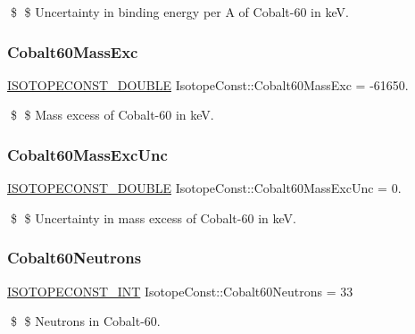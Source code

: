 \$ \$ Uncertainty in binding energy per A of Cobalt-\/60 in keV. \mbox{\label{group___isotope_const-_cobalt-_co60_ga7a0da0914106ad30627df699b24654e4}} 
\subsubsection{\texorpdfstring{Cobalt60\+Mass\+Exc}{Cobalt60MassExc}}
{\footnotesize\ttfamily \mbox{\hyperlink{group___isotope_const-_macros_ga8f45a7272ce02c0b4c65c44636ed719a}{I\+S\+O\+T\+O\+P\+E\+C\+O\+N\+S\+T\+\_\+\+D\+O\+U\+B\+LE}} Isotope\+Const\+::\+Cobalt60\+Mass\+Exc = -\/61650.}

\$ \$ Mass excess of Cobalt-\/60 in keV. \mbox{\label{group___isotope_const-_cobalt-_co60_gae9c7544fdba174f3b1fa014314274875}} 
\subsubsection{\texorpdfstring{Cobalt60\+Mass\+Exc\+Unc}{Cobalt60MassExcUnc}}
{\footnotesize\ttfamily \mbox{\hyperlink{group___isotope_const-_macros_ga8f45a7272ce02c0b4c65c44636ed719a}{I\+S\+O\+T\+O\+P\+E\+C\+O\+N\+S\+T\+\_\+\+D\+O\+U\+B\+LE}} Isotope\+Const\+::\+Cobalt60\+Mass\+Exc\+Unc = 0.}

\$ \$ Uncertainty in mass excess of Cobalt-\/60 in keV. \mbox{\label{group___isotope_const-_cobalt-_co60_ga7f7dd62f61facd0ff97edea4f298204f}} 
\subsubsection{\texorpdfstring{Cobalt60\+Neutrons}{Cobalt60Neutrons}}
{\footnotesize\ttfamily \mbox{\hyperlink{group___isotope_const-_macros_ga5f18360b3e99483a35c32d789e62621c}{I\+S\+O\+T\+O\+P\+E\+C\+O\+N\+S\+T\+\_\+\+I\+NT}} Isotope\+Const\+::\+Cobalt60\+Neutrons = 33}

\$ \$ Neutrons in Cobalt-\/60. \mbox{\label{group___isotope_const-_cobalt-_co60_gac234df716a120e826b8362b0962b32f9}} 
